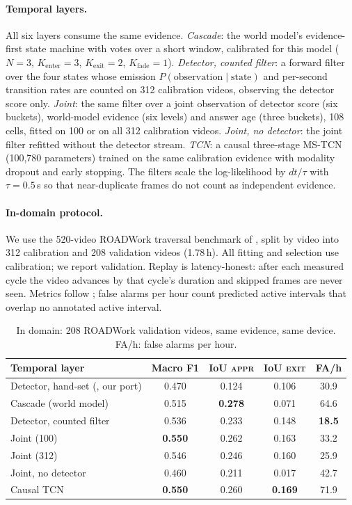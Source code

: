 \documentclass[conference]{IEEEtran}
\newcommand{\st}[1]{\textsc{#1}}
\begin{document}
\paragraph{Temporal layers.} All six layers consume the same evidence.
\emph{Cascade}: the world model's evidence-first state machine with votes over a short window, calibrated for this model ($N{=}3$, $K_\text{enter}{=}3$, $K_\text{exit}{=}2$, $K_\text{fade}{=}1$).
\emph{Detector, counted filter}: a forward filter over the four states whose emission $P(\text{observation}\mid\text{state})$ and per-second transition rates are counted on 312 calibration videos, observing the detector score only.
\emph{Joint}: the same filter over a joint observation of detector score (six buckets), world-model evidence (six levels) and answer age (three buckets), 108 cells, fitted on 100 or on all 312 calibration videos.
\emph{Joint, no detector}: the joint filter refitted without the detector stream.
\emph{TCN}: a causal three-stage MS-TCN (100{,}780 parameters) trained on the same calibration evidence with modality dropout and early stopping.
The filters scale the log-likelihood by $dt/\tau$ with $\tau{=}0.5$\,s so that near-duplicate frames do not count as independent evidence.

\paragraph{In-domain protocol.} We use the 520-video ROADWork traversal benchmark of \cite{priorsystem2026}, split by video into 312 calibration and 208 validation videos (1.78\,h). All fitting and selection use calibration; we report validation. Replay is latency-honest: after each measured cycle the video advances by that cycle's duration and skipped frames are never seen. Metrics follow \cite{priorsystem2026}; false alarms per hour count predicted active intervals that overlap no annotated active interval.

\begin{table}[t]
\centering
\caption{In domain: 208 ROADWork validation videos, same evidence, same device. FA/h: false alarms per hour.}
\label{tab:indomain}
\footnotesize
\setlength{\tabcolsep}{4pt}
\begin{tabular}{@{}lcccc@{}}
\toprule
Temporal layer & Macro F1 & IoU \st{appr} & IoU \st{exit} & FA/h \\
\midrule
Detector, hand-set (\cite{priorsystem2026}, our port) & 0.470 & 0.124 & 0.106 & 30.9 \\
Cascade (world model) & 0.515 & \textbf{0.278} & 0.071 & 64.6 \\
Detector, counted filter & 0.536 & 0.233 & 0.148 & \textbf{18.5} \\
Joint (100) & \textbf{0.550} & 0.262 & 0.163 & 33.2 \\
Joint (312) & 0.546 & 0.246 & 0.160 & 25.9 \\
Joint, no detector & 0.460 & 0.211 & 0.017 & 42.7 \\
Causal TCN & \textbf{0.550} & 0.260 & \textbf{0.169} & 71.9 \\
\bottomrule
\end{tabular}
\end{table}
\end{document}
